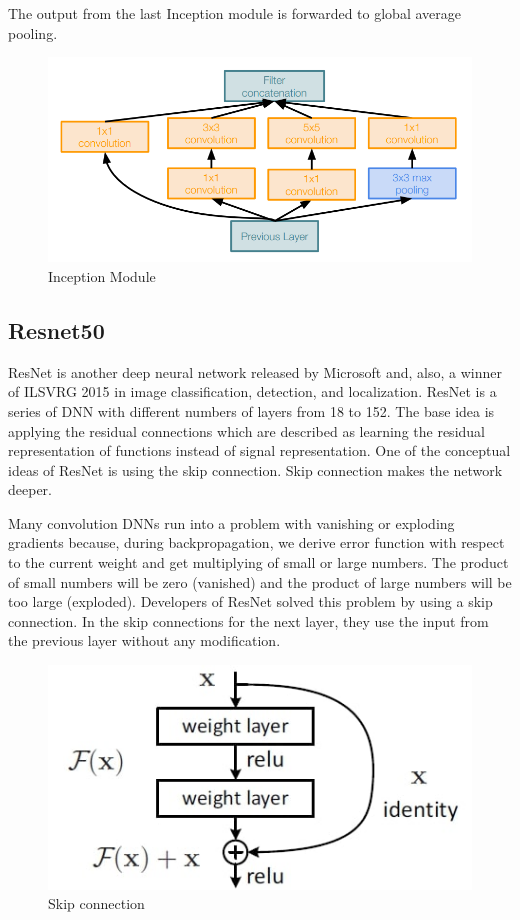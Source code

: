 \documentclass[titlepage]{report}
\begin{document}
The output from the last Inception module is forwarded to global average pooling.

\begin{figure}[h!]
    \centering
    \includegraphics[scale=0.4]{googlenet}
    \caption{Inception Module}
\end{figure}

\subsection{Resnet50}
ResNet is another deep neural network released by Microsoft and, also, a winner of ILSVRG 2015 in image classification, detection, and localization. ResNet is a series of DNN with different numbers of layers from 18 to 152. The base idea is applying the residual connections which are described as learning the residual representation of functions instead of signal representation. One of the conceptual ideas of ResNet is using the skip connection. Skip connection makes the network deeper.  

Many convolution DNNs run into a problem with vanishing or exploding gradients because, during backpropagation, we derive error function with respect to the current weight and get multiplying of small or large numbers. The product of small numbers will be zero (vanished) and the product of large numbers will be too large (exploded). Developers of ResNet solved this problem by using a skip connection. In the skip connections for the next layer, they use the input from the previous layer without any modification. 

\begin{figure}[h!]
    \centering
    \includegraphics[scale=0.4]{resnet_1}
    \caption{Skip connection}
\end{figure}
\end{document}
